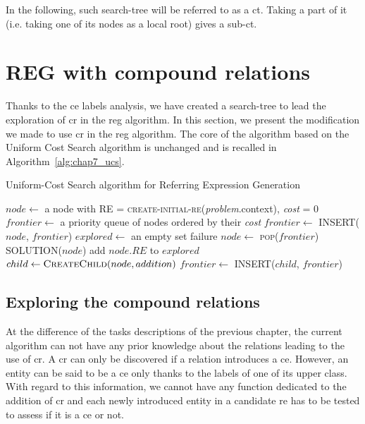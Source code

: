In the following, such search-tree will be referred to as a \acrfull{ct}. Taking a part of it (i.e. taking one of its nodes as a local root) gives a sub-\acrshort{ct}.

\section{REG with compound relations}

Thanks to the \acrshort{ce} labels analysis, we have created a search-tree to lead the exploration of \acrshort{cr} in the \acrshort{reg} algorithm. In this section, we present the modification we made to use \acrshort{cr} in the \acrshort{reg} algorithm. The core of the algorithm based on the Uniform Cost Search algorithm is unchanged and is recalled in Algorithm~\ref{alg:chap7_ucs}.

\begin{algorithm}[!ht]
\caption{Uniform-Cost Search algorithm for Referring Expression Generation}
\label{alg:chap7_ucs}
\begin{algorithmic}
    \State $node\leftarrow$ a node with RE = \textsc{create-initial-re}(\textit{problem}.context), \textit{cost} = 0
    \State $frontier\leftarrow$ a priority queue of nodes ordered by their \textit{cost}
    \State $frontier\leftarrow$ \textsc{INSERT}($node$, $frontier$)
    \State $explored\leftarrow$ an empty set
    \Loop
        	\State \Return failure
        \EndIf
        \State $node\leftarrow$ \textsc{pop}($frontier$)
        	\State \Return \textsc{SOLUTION}($node$)
        \EndIf
        \State add $node.RE$ to $explored$
            \State $child \leftarrow \textsc{CreateChild}(node, addition)$
            	\State $frontier\leftarrow$ \textsc{INSERT}($child$, $frontier$)
            \EndIf
        \EndFor
    \EndLoop
\EndFunction
\end{algorithmic}
\end{algorithm}

\subsection{Exploring the compound relations}

At the difference of the tasks descriptions of the previous chapter, the current algorithm can not have any prior knowledge about the relations leading to the use of \acrshort{cr}. A \acrshort{cr} can only be discovered if a relation introduces a \acrshort{ce}. However, an entity can be said to be a \acrshort{ce} only thanks to the labels of one of its upper class. With regard to this information, we cannot have any function dedicated to the addition of \acrshort{cr} and each newly introduced entity in a candidate \acrshort{re} has to be tested to assess if it is a \acrshort{ce} or not.


